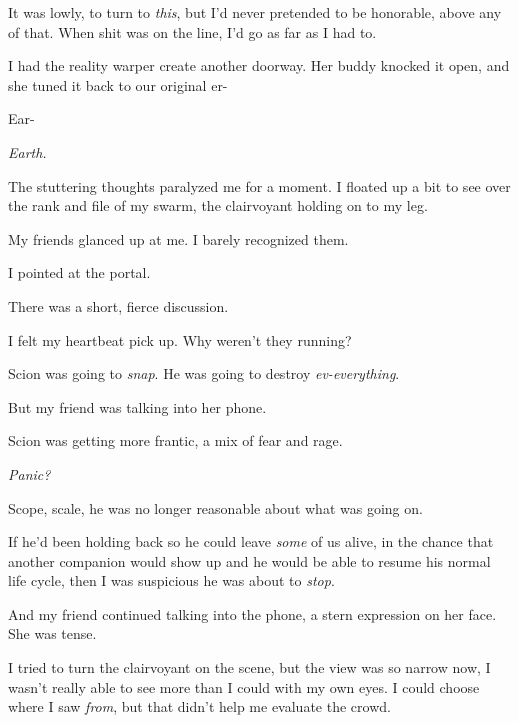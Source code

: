 It was lowly, to turn to \emph{this}, but I'd never pretended to be honorable, above any of that.  When shit was on the line, I'd go as far as I had to.



I had the reality warper create another doorway.  Her buddy knocked it open, and she tuned it back to our original er-



Ear-



\emph{Earth.}



The stuttering thoughts paralyzed me for a moment.  I floated up a bit to see over the rank and file of my swarm, the clairvoyant holding on to my leg.



My friends glanced up at me.  I barely recognized them.



I pointed at the portal.



There was a short, fierce discussion.



I felt my heartbeat pick up.  Why weren't they running?



Scion was going to \emph{snap}.  He was going to destroy\emph{ ev-everything}.



But my friend was talking into her phone.



Scion was getting more frantic, a mix of fear and rage.



\emph{Panic?}



Scope, scale, he was no longer reasonable about what was going on.



If he'd been holding back so he could leave \emph{some} of us alive, in the chance that another companion would show up and he would be able to resume his normal life cycle, then I was suspicious he was about to \emph{stop}.



And my friend continued talking into the phone, a stern expression on her face.  She was tense.



I tried to turn the clairvoyant on the scene, but the view was so narrow now, I wasn't really able to see more than I could with my own eyes.  I could choose where I saw \emph{from}, but that didn't help me evaluate the crowd.



